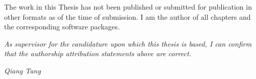 

The work in this Thesis has not been published or submitted for publication in other formats as of the time of submission. I am the author of all chapters and the corresponding software packages.


\vspace{2cm}

\emph{As supervisor for the candidature upon which this thesis is based, I can confirm that the authorship attribution statements above are correct.}

\vspace{2cm}

\noindent \emph{Qiang Tang}